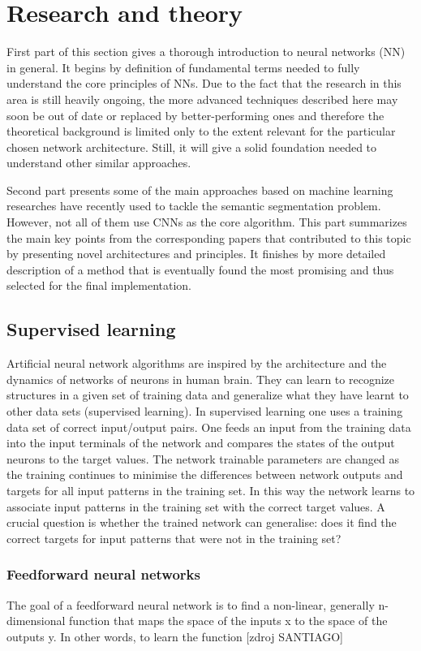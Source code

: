\chapter{Research and theory}
\label{research}
First part of this section gives a thorough introduction to neural networks (NN) in general. It begins by definition of fundamental terms needed to fully understand the core principles of NNs. Due to the fact that the research in this area is still heavily ongoing, the more advanced techniques described here may soon be out of date or replaced by better-performing ones and therefore the theoretical background is limited only to the extent relevant for the particular chosen network architecture. Still, it will give a solid foundation needed to understand other similar approaches. 

Second part presents some of the main approaches based on machine learning researches have recently used to tackle the semantic segmentation problem. However, not all of them use CNNs as the core algorithm. This part summarizes the main key points from the corresponding papers that contributed to this topic by presenting novel architectures and principles. It finishes by more detailed description of a method that is eventually found the most promising and thus selected for the final implementation.

\section{Supervised learning}
Artificial neural network algorithms are inspired by the architecture and the dynamics
of networks of neurons in human brain. They can learn to recognize structures in a given set of training data and generalize what they have learnt to other data sets (supervised learning). In supervised learning one uses a training data set of correct input/output pairs. One feeds an input from the training data into the input terminals of the network and compares the states of the output neurons to the target values. The network trainable parameters are changed as the training continues to minimise the differences between network outputs and targets for all input patterns in the training set. In this way the network learns to associate input patterns in the training set with the correct target values. A crucial question is whether the trained network can generalise: does it find the correct targets for input patterns that were not in the training set? 

\subsection{Feedforward neural networks}
The goal of a feedforward neural network is to find a non-linear, generally n-dimensional function that maps the space of the inputs x to the space of the outputs y. In other words, to learn the function [zdroj SANTIAGO]

